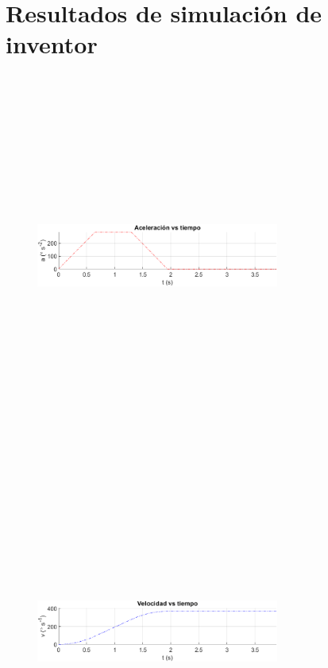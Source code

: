 \documentclass[12pt]{article}
\begin{document}
\newpage

\section{Resultados de simulación de inventor}\label{RInventor}

\begin{multicols}{2}
\begin{figure} [H]
        \centerline{\includegraphics[width=8cm, height=12cm,keepaspectratio]{simulacion/a2.png}}
    \end{figure}
    \vspace{-20pt}
        \begin{figure} [H]
        \centerline{\includegraphics[width=8cm, height=12cm,keepaspectratio]{simulacion/v2.png}}

\end{figure}
\end{multicols}
\end{document}
